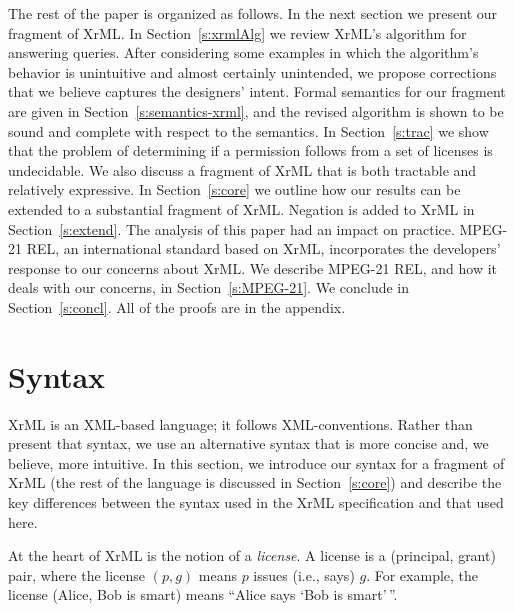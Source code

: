 \documentclass{acmtrans2m}
\newcommand{\<}{
}
\renewcommand{\>}{\rangle}
\begin{document}
The rest of the paper is organized as follows.  In the next section we present
our
fragment of XrML.  In Section~\ref{s:xrmlAlg} we review XrML's algorithm for
answering queries.  After considering some examples in which the algorithm's behavior is
unintuitive and almost certainly unintended, we propose corrections that we believe captures
the designers' intent.  Formal semantics for
our fragment
are given in Section~\ref{s:semantics-xrml},
and the revised algorithm is shown to be sound and complete with respect to the semantics.  In
Section~\ref{s:trac} we show that the problem of determining if a permission follows from a set
of licenses is undecidable.  We also discuss a fragment of
XrML
that is both tractable
and relatively expressive.  In Section~\ref{s:core} we outline how our
results can be extended to
a substantial
fragment of XrML.
Negation is added to XrML in Section~\ref{s:extend}.
The analysis of this paper had an impact on practice.
MPEG-21 REL, an international standard based on XrML,
incorporates the developers' response to our concerns about XrML.
We describe MPEG-21 REL, and how it deals with our concerns,
in Section~\ref{s:MPEG-21}.
We conclude in Section~\ref{s:concl}.  All of the proofs are in the
appendix.

\section{Syntax}\label{s:XrMLsyntax}
XrML is an XML-based language; it follows XML-conventions.  Rather than present that syntax,
we use an alternative syntax that is more concise and, we believe, more intuitive.  In this
section, we introduce our syntax for a
fragment of XrML (the rest of the
language is discussed in Section~\ref{s:core}) and describe the key differences between the
syntax used in the XrML specification and that used here.

At the heart of XrML is the notion of a \emph{license}.  A license is a (principal, grant)
pair, where the license $(p, g)$ means $p$ issues (i.e., says) $g$.  For example, the
license (Alice, Bob is smart) means ``Alice says `Bob is smart'$\,$''.
\end{document}
